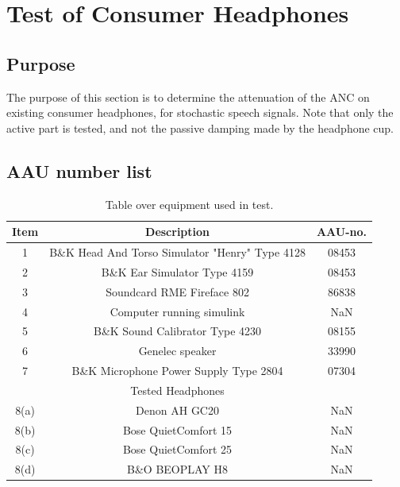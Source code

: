 
\section{Test of Consumer Headphones}
\subsection{Purpose}
The purpose of this section is to determine the attenuation of the ANC on existing consumer headphones, for stochastic speech signals. 
Note that only the active part is tested, and not the passive damping made by the headphone cup.


\subsection{AAU number list}
\begin{table}[H]
	\centering
	\begin{tabular}{ c c c } \toprule
	{Item}	&	{Description} 								& {AAU-no}. \\ 
								\bottomrule 
		1	&	B\&K Head And Torso Simulator "Henry" Type 4128	& 08453	\\
		2	&	B\&K Ear Simulator Type 4159				& 08453		\\
		3	&	Soundcard RME Fireface 802					& 86838		\\
		4	&	Computer running simulink					& NaN		\\
		5	&	B\&K Sound Calibrator Type 4230				& 08155		\\ 
		6	&	Genelec speaker								& 33990		\\ 
		7	& 	B\&K Microphone Power Supply Type 2804		& 07304		\\
								\bottomrule
							& Tested Headphones 			& 			\\
								\bottomrule
		8(a)	& Denon AH GC20 								& NaN 		\\
		8(b)	& Bose QuietComfort 15 							& NaN 		\\
		8(c)	& Bose QuietComfort 25						 	& NaN		\\
		8(d)	& B\&O BEOPLAY H8 								& NaN		\\
								\bottomrule
	\end{tabular}
	\caption{Table over equipment used in test.}
	\label{tab:UsedEquipmentListConsumerHP}
\end{table}

